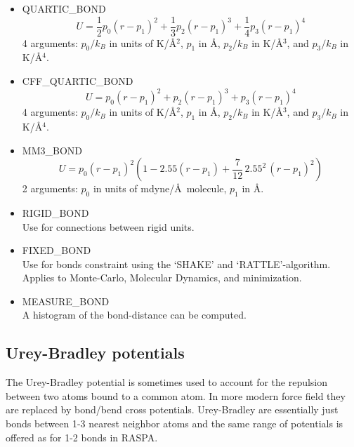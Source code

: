 \begin{itemize}
  \item{QUARTIC\_BOND}
  \begin{equation}
  U=\frac{1}{2} p_0 \left(r-p_1\right)^2+ \frac{1}{3} p_2 \left(r-p_1\right)^3+ \frac{1}{4} p_3 \left(r-p_1\right)^4
  \end{equation}
  4 arguments: $p_0/k_B$ in units of K/\AA$^2$, $p_1$ in \AA, $p_2/k_B$ in K/\AA$^3$, and $p_3/k_B$ in K/\AA$^4$.

  \item{CFF\_QUARTIC\_BOND}
  \begin{equation}
  U=p_0 \left(r-p_1\right)^2+ p_2 \left(r-p_1\right)^3+ p_3 \left(r-p_1\right)^4
  \end{equation}
  4 arguments: $p_0/k_B$ in units of K/\AA$^2$, $p_1$ in \AA, $p_2/k_B$ in K/\AA$^3$, and $p_3/k_B$ in K/\AA$^4$.

  \item{MM3\_BOND}
  \begin{equation}
  U=p_0 \left(r-p_1\right)^2\left(1-2.55\left(r-p_1\right)+\frac{7}{12}\,2.55^2\,\left(r-p_1\right)^2\right)
  \end{equation}
  2 arguments: $p_0$ in units of mdyne/\AA\, molecule, $p_1$ in \AA.

  \item{RIGID\_BOND}\\
  Use for connections between rigid units.

  \item{FIXED\_BOND}\\
  Use for bonds constraint using the `SHAKE' and `RATTLE'-algorithm. Applies to Monte-Carlo, Molecular Dynamics, and minimization.

  \item{MEASURE\_BOND}\\
  A histogram of the bond-distance can be computed.

\end{itemize}

\subsection{Urey-Bradley potentials}

The Urey-Bradley potential is sometimes used to account for the repulsion between two atoms bound to a common
atom. In more modern force field they are replaced by bond/bend cross potentials.
Urey-Bradley are essentially just bonds between 1-3 nearest neighbor atoms and 
the same range of potentials is offered as for 1-2 bonds in RASPA.


